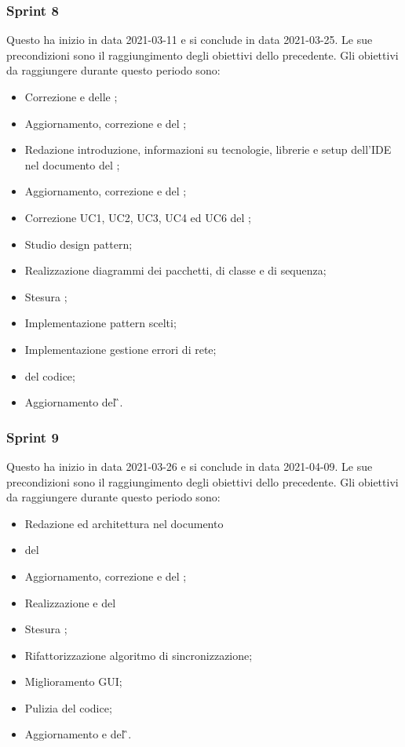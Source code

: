 \subsubsection{Sprint 8}
Questo  ha inizio in data 2021-03-11 e si conclude in data 2021-03-25.  Le sue precondizioni sono il raggiungimento degli obiettivi dello  precedente.\newline{}
Gli obiettivi da raggiungere durante questo periodo sono:
\begin{itemize}
	\item Correzione e  delle \NdP{};
	\item Aggiornamento, correzione e  del \PdP{};
	\item Redazione introduzione, informazioni su tecnologie, librerie e setup dell'IDE nel documento del \MS{};
	\item Aggiornamento, correzione e  del \PdQ{};
	\item Correzione UC1, UC2, UC3, UC4 ed UC6 del \AdR{};
	\item Studio design pattern;
	\item Realizzazione diagrammi dei pacchetti, di classe e di sequenza;
	\item Stesura ;
	\item Implementazione pattern scelti;
	\item Implementazione gestione errori di rete;
	\item {} del codice;
	\item Aggiornamento del \G{}.
\end{itemize}

\subsubsection{Sprint 9}
Questo  ha inizio in data 2021-03-26 e si conclude in data 2021-04-09. Le sue precondizioni sono il raggiungimento degli obiettivi dello  precedente.\newline{}
Gli obiettivi da raggiungere durante questo periodo sono:
\begin{itemize}
	\item Redazione  ed architettura nel documento \MS{}
	\item {} del \MS{}
	\item Aggiornamento, correzione e  del \PdP{};
	\item Realizzazione e  del \MU{}
	\item Stesura ;
	\item Rifattorizzazione algoritmo di sincronizzazione;
	\item Miglioramento GUI;
	\item Pulizia del codice;
	\item Aggiornamento e  del \G{}.
\end{itemize}
